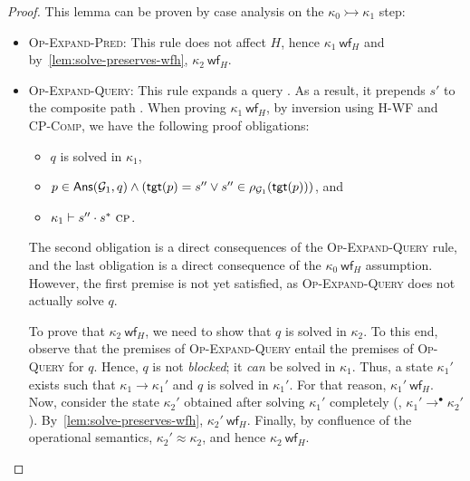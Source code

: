 \begin{proof}
  This lemma can be proven by case analysis on the $\kappa_0 \rightarrowtail \kappa_1$ step:
  \begin{itemize}
    \item \textsc{Op-Expand-Pred}: This rule does not affect $H$, hence $\kappa_1 \ \mathsf{wf}_{H}$ and by~\cref{lem:solve-preserves-wfh}, $\kappa_2 \ \mathsf{wf}_{H}$.
    \item \textsc{Op-Expand-Query}: This rule expands a query .
      As a result, it prepends $s'$ to the composite path .
      When proving $\kappa_1 \ \mathsf{wf}_{H}$, by inversion using \textsc{H-WF} and \textsc{CP-Comp}, we have the following proof obligations:
      \begin{itemize}
          \item $q$ is solved in $\kappa_1$,
          \item $p \in \mathsf{Ans}(\mathcal{G}_1, q) \land (\mathsf{tgt}(p) = s'' \lor s'' \in \rho_{\mathcal{G}_1}(\mathsf{tgt}(p)))$, and
          \item $\kappa_1 \vdash s'' \cdot s^{*} \ \textsc{cp}$.
      \end{itemize}
      The second obligation is a direct consequences of the \textsc{Op-Expand-Query} rule, and the last obligation is a direct consequence of the $\kappa_0 \ \mathsf{wf}_{H}$ assumption.
      However, the first premise is not yet satisfied, as \textsc{Op-Expand-Query} does not actually solve $q$.

      To prove that $\kappa_2 \ \mathsf{wf}_{H}$, we need to show that $q$ is solved in $\kappa_2$.
      To this end, observe that the premises of \textsc{Op-Expand-Query} entail the premises of \textsc{Op-Query} for $q$.
      Hence, $q$ is not \emph{blocked}; it \emph{can} be solved in $\kappa_1$.
      Thus, a state $\kappa_1'$ exists such that $\kappa_1 \rightarrow \kappa_1'$ and $q$ is solved in $\kappa_1'$.
      For that reason, $\kappa_1' \ \mathsf{wf}_{H}$.
      Now, consider the state $\kappa_2'$ obtained after solving $\kappa_1'$ completely (\ie, $\kappa_1' \rightarrow^{\bullet} \kappa_2'$).
      By~\cref{lem:solve-preserves-wfh}, $\kappa_2' \ \mathsf{wf}_{H}$.
      Finally, by confluence of the operational semantics, $\kappa_2' \approx \kappa_2$, and hence $\kappa_2 \ \mathsf{wf}_{H}$.
  \end{itemize}
\end{proof}

